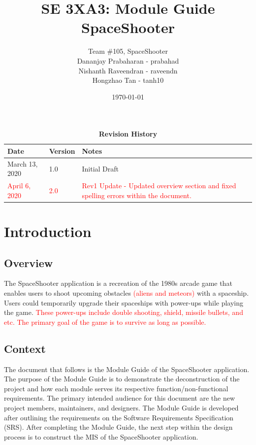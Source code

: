 \documentclass[12pt, titlepage]{article}
\title{SE 3XA3: Module Guide\\SpaceShooter}
\author{Team \#105, SpaceShooter
		\\ Dananjay Prabaharan - prabahad
		\\ Nishanth Raveendran - raveendn
		\\ Hongzhao Tan - tanh10
}
\date{\today}
\begin{document}
\maketitle

\tableofcontents
\listoftables
\listoffigures

\begin{table}[H]
\caption{\bf Revision History}
\begin{tabularx}{\textwidth}{p{3cm}p{2cm}X}
\toprule {\bf Date} & {\bf Version} & {\bf Notes}\\
\midrule
March 13, 2020 & 1.0 & Initial Draft\\
\textcolor{red}{April 6, 2020} & \textcolor{red}{2.0} & \textcolor{red}{Rev1 Update - Updated overview section and fixed spelling errors within the document.}\\
\bottomrule
\end{tabularx}
\end{table}

\newpage


\section{Introduction}

\subsection{Overview}
The SpaceShooter application is a recreation of the 1980s arcade game that enables users to shoot upcoming obstacles \textcolor{red}{(aliens and meteors)} with a spaceship. Users could temporarily upgrade their spaceships with power-ups while playing the game. \textcolor{red}{These power-ups include double shooting, shield, missile bullets, and etc. The primary goal of the game is to survive as long as possible.}

\subsection{Context}
The document that follows is the Module Guide of the SpaceShooter application. The purpose of the Module Guide is to demonstrate the deconstruction of the project and how each module serves its respective function/non-functional requirements. The primary intended audience for this document are the new project members, maintainers, and designers. The Module Guide is developed after outlining the requirements on the Software Requirements Specification (SRS). After completing the Module Guide, the next step within the design process is to construct the MIS of the SpaceShooter application. 
\end{document}

